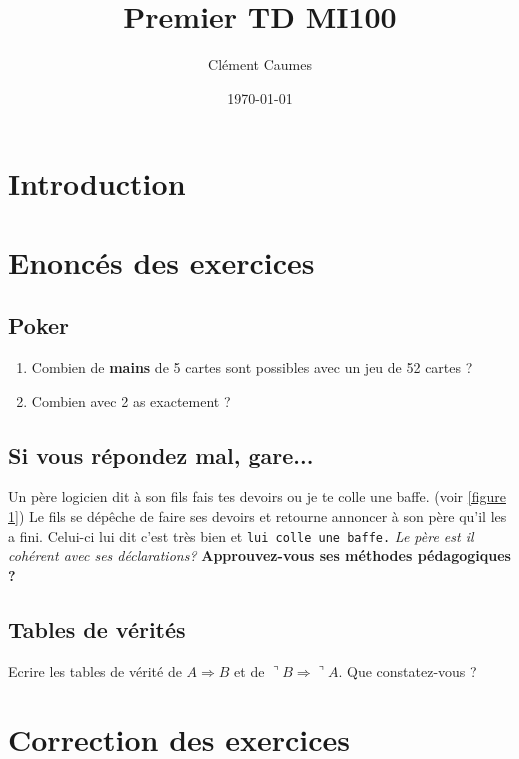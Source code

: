 \documentclass[a4]{article}
\author{Clément Caumes}
\title{Premier TD MI100}
\date{\today}
\begin{document}
\maketitle
\section{Introduction}
\section{Enoncés des exercices}
\subsection{Poker}
\begin{enumerate}
\item Combien de \textbf{mains} de 5 cartes sont possibles avec {\tiny un jeu} de 52 cartes ?
\item Combien avec 2 as {\huge exactement} ? 
\end{enumerate}
\subsection{Si vous répondez mal, gare...}
Un père {\large logicien} dit à son fils \textsf{fais tes devoirs ou je te colle une baffe.} (voir \ref{figure 1}) Le fils se dépêche de faire ses devoirs et retourne 
annoncer à son père qu'il les a fini. Celui-ci lui dit c'est très bien et \texttt{lui colle une baffe.} \textit{Le père est il cohérent avec ses déclarations?}
\textbf{Approuvez-vous ses méthodes pédagogiques ?}
\subsection{Tables de vérités}
Ecrire les tables de vérité de $A \Rightarrow B$ et de $\urcorner B\Rightarrow \urcorner A$. Que constatez-vous ? 
\section{Correction des exercices}
\end{document}
